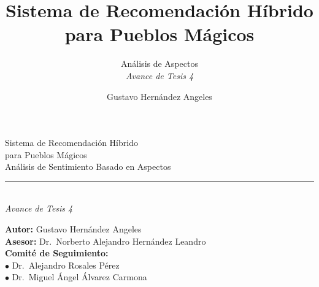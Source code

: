 \documentclass[aspectratio=169,11pt]{beamer}
\title{Sistema de Recomendaci\'on H\'ibrido\\para Pueblos M\'agicos}
\subtitle{An\'alisis de Aspectos\\
\vspace{0.4em}\textit{Avance de Tesis 4}}
\author{Gustavo Hern\'andez Angeles}
\date{}
\begin{document}
\begin{frame}[plain]
	\vspace{1.5em}
	\begin{center}
		{\color{navy}Sistema de Recomendaci\'on H\'ibrido\\para Pueblos M\'agicos}\\[0.6em]
		{\color{navy}An\'alisis de Sentimiento Basado en Aspectos}\\[0.3em]
		{\color{rule}\rule{0.5\linewidth}{0.4pt}}\\[0.4em]
		{\large\itshape Avance de Tesis 4}
	\end{center}
	\vspace{1.2em}
	\begin{flushleft}
		\textbf{Autor:} Gustavo Hern\'andez Angeles\\
		\textbf{Asesor:} Dr.\ Norberto Alejandro Hern\'andez Leandro\\[0.3em]
		\textbf{Comit\'e de Seguimiento:}\\
		\quad$\bullet$ Dr.\ Alejandro Rosales P\'erez\\
		\quad$\bullet$ Dr.\ Miguel \'Angel \'Alvarez Carmona\\[0.5em]
	\end{flushleft}
\end{frame}
\end{document}

